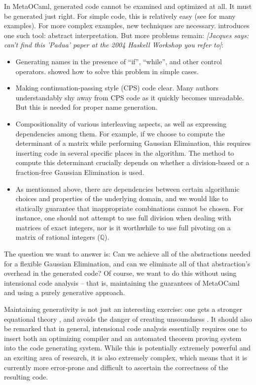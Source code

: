 \documentclass{llncs}
\newcommand{\jacques}[1]{{\it [Jacques says: #1]}}
\begin{document}
In MetaOCaml, generated code cannot be examined and optimized at all. It must
be generated just right.  For simple code, this is relatively easy
(see \cite{TahaThesis} for many examples).  For more complex examples,
new techniques are necessary.  \cite{KiselyovTaha} introduces one
such tool: abstract interpretation.  But more problems remain:
\jacques{can't find this 'Padua' paper at the 2004 Haskell Workshop 
you refer to}: 
\begin{itemize}
    \item Generating names in the presence of ``if'', ``while'', and other
        control operators. \cite{KiselyovTaha} showed how to solve
        this problem in simple cases.
    \item Making continuation-passing style (CPS) code clear.  Many
        authors understandably shy away from CPS code as it quickly
        becomes unreadable.  But this is needed for proper name
        generation.
    \item Compositionality of various interleaving aspects, as well
        as expressing dependencies among them.  For example, if we
        choose to compute the determinant of a matrix while performing
        Gaussian Elimination, this requires inserting code in 
        several specific places in the algorithm.  The method to
        compute this determinant crucially depends on whether 
        a division-based or a fraction-free Gaussian Elimination is
        used.
    \item As mentionned above, there are dependencies between
        certain algorithmic choices and properties of the
        underlying domain, and we would like to statically guarantee
        that inappropriate combinations cannot be chosen.  For instance,
        one should not attempt to use full division when dealing
        with matrices of exact integers, nor is it worthwhile to use
        full pivoting on a matrix of rational integers ($\mathbb Q $).
\end{itemize}
The question we want to answer is:
Can we achieve all of the abstractions needed for a flexible 
Gaussian Elimination, and can
we eliminate all of that abstraction's overhead in the generated code?
Of course, we want to do this without using
intensional code analysis -- that is, maintaining the
guarantees of MetaOCaml and using a purely generative approach.

Maintaining generativity is not just an interesting exercise:
one gets a stronger equational theory \cite{Taha2000}, and avoids
the danger of creating unsoundness \cite{TahaThesis}.  It should
also be remarked that in general, intensional code analysis
\cite{Pueschel:05,Kennedy01Telescoping,dongarra7,Veldhuizen:2004} 
essentially requires
one to insert both an optimizing compiler and an automated theorem
proving system into the code generating system.  While this is
potentially extremely powerful and an exciting area of research,
it is also extremely complex, which means that it is currently more
error-prone and difficult to ascertain the correctness of the 
resulting code.
\end{document}
